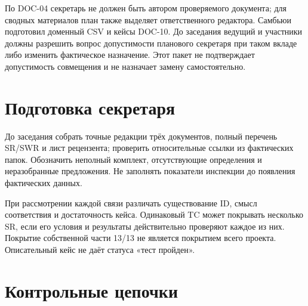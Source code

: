 \documentclass[12pt,a4paper]{article}
\begin{document}
По DOC-04 секретарь не должен быть автором проверяемого документа; для сводных материалов план также выделяет ответственного редактора. Самбьюи подготовил доменный CSV и кейсы DOC-10. До заседания ведущий и участники должны разрешить вопрос допустимости планового секретаря при таком вкладе либо изменить фактическое назначение. Этот пакет не подтверждает допустимость совмещения и не назначает замену самостоятельно.

\section{Подготовка секретаря}\label{ux43fux43eux434ux433ux43eux442ux43eux432ux43aux430-ux441ux435ux43aux440ux435ux442ux430ux440ux44f}

\hypertarget{подготовка-секретаря}{}

До заседания собрать точные редакции трёх документов, полный перечень SR/SWR и лист рецензента; проверить относительные ссылки из фактических папок. Обозначить неполный комплект, отсутствующие определения и неразобранные предложения. Не заполнять показатели инспекции до появления фактических данных.

При рассмотрении каждой связи различать существование ID, смысл соответствия и достаточность кейса. Одинаковый TC может покрывать несколько SR, если его условия и результаты действительно проверяют каждое из них. Покрытие собственной части 13/13 не является покрытием всего проекта. Описательный кейс не даёт статуса «тест пройден».

\section{Контрольные цепочки}\label{ux43aux43eux43dux442ux440ux43eux43bux44cux43dux44bux435-ux446ux435ux43fux43eux447ux43aux438}

\hypertarget{контрольные-цепочки}{}
\end{document}
